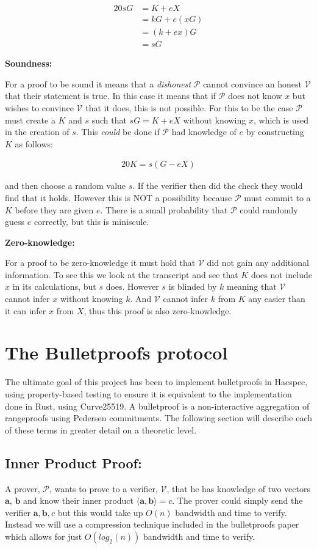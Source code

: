 \documentclass{article}
\newcommand{\eq}[1]{\begin{alignat*}{20}#1\end{alignat*}}
\renewcommand{\vec}[1]{\boldsymbol{#1}}
\newcommand{\V}{\mathcal{V}}
\renewcommand{\P}{\mathcal{P}}
\newcommand{\dotp}[2]{\langle #1, #2 \rangle}
\begin{document}
\eq{
	sG &= K + eX \\
	   &= kG + e(xG) \\
	   &= (k + ex)G \\
	   &= sG
}

\textbf{Soundness:}

For a proof to be sound it means that a \textit{dishonest} $\P$
cannot convince an honest $\V$ that their statement is true. In this
case it means that if $\P$ does not know $x$ but wishes to convince
$\V$ that it does, this is not possible. For this to be the case $\P$
must create a $K$ and $s$ such that $sG = K + eX$ without knowing $x$,
which is used in the creation of $s$. This \textit{could} be done if
$\P$ had knowledge of $e$ by constructing $K$ as follows:

\eq{
	K = s(G - eX)
}

and then choose a random value $s$. If the verifier then did the check
they would find that it holds. However this is NOT a possibility
because $\P$ must commit to a $K$ before they are given $e$. There
is a small probability that $\P$ could randomly guess $e$ correctly,
but this is miniscule.

\textbf{Zero-knowledge:}

For a proof to be zero-knowledge it must hold that $\V$ did not gain any additional information. To see this we look at the transcript and see that $K$ does not include $x$ in its calculations, but $s$ does. However $s$ is blinded by $k$ meaning that $\V$ cannot infer $x$ without knowing $k$. And $\V$ cannot infer $k$ from $K$ any easier than it can infer $x$ from $X$, thus this proof is also zero-knowledge. 

\section{The Bulletproofs protocol}

The ultimate goal of this project has been to implement bulletproofs in
Hacspec, using property-based testing to ensure it is equivalent to the
implementation done in Rust, using Curve25519. A bulletproof is a
non-interactive aggregation of rangeproofs using Pedersen commitments.
The following section will describe each of these terms in greater detail
on a theoretic level.

\subsection{Inner Product Proof:}
A prover, $\P$, wants to prove to a verifier, $\V$, that he has knowledge
of two vectors $\vec{a}$, $\vec{b}$ and know their inner product
$\dotp{\vec{a}}{\vec{b}} = c$. The prover could simply send the verifier
$\vec{a}, \vec{b}, c$ but this would take up $O(n)$ bandwidth and
time to verify. Instead we will use a compression technique included
in the bulletproofs paper which allows for just $O(log_2(n))$ bandwidth
and time to verify.
\end{document}
